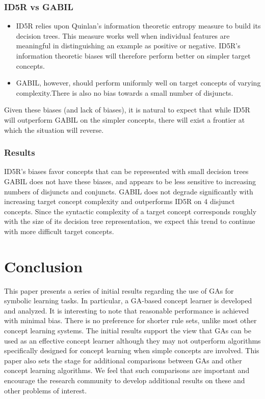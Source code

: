 \documentclass[../main.tex]{subfiles}
\begin{document}
\subsubsection{ID5R vs GABIL}

\begin{itemize}
	\item ID5R relies upon Quinlan’s information theoretic entropy measure to build its decision trees. This measure
	works well when individual features are meaningful in distinguishing an example as positive or negative.  ID5R’s
	information theoretic biases will therefore perform better on simpler target concepts.
	\item GABIL, however, should perform uniformly well on target concepts of varying complexity.There is also no bias
	towards a small number of disjuncts.
\end{itemize}

Given these biases (and lack of biases), it is natural to expect that while ID5R will outperform GABIL on the simpler
concepts, there will exist a frontier at which the situation will reverse.

\subsubsection{Results}

ID5R’s biases favor concepts that can be represented with small decision trees GABIL does not have these biases, and
appears to be less sensitive to increasing numbers of disjuncts and conjuncts. GABIL does not degrade significantly
with increasing target concept complexity and outperforms ID5R on 4 disjunct concepts. Since the syntactic complexity
of a target concept corresponds roughly with the size of its decision tree representation, we expect this trend to
continue with more difficult target concepts.

\section{Conclusion}

This paper presents a series of initial results regarding the use of GAs for symbolic learning tasks. In particular, a
GA-based concept learner is developed and analyzed. It is interesting to note that reasonable performance is achieved
with minimal bias. There is no preference for shorter rule sets, unlike most other concept learning systems. The
initial results support the view that GAs can be used as an effective concept learner although they may not outperform
algorithms specifically designed for concept learning when simple concepts are involved. This paper also sets the stage
for additional comparisons between GAs and other concept learning algorithms. We feel that such comparisons are
important and encourage the research community to develop additional results on these and other problems of interest.
\end{document}
